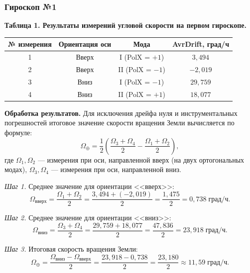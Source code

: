 \documentclass[12pt, a4paper]{article}
\begin{document}
\subsubsection*{Гироскоп №1}

\textbf{Таблица 1. Результаты измерений угловой скорости на первом гироскопе.}

\begin{table}[H]
\centering
\begin{tabular}{|c|c|c|c|}
\hline
\textbf{№ измерения} & \textbf{Ориентация оси} & \textbf{Мода} & \textbf{AvrDrift, град/ч} \\
\hline
1 & Вверх & I (PolX = $+1$) & $3{,}494$ \\
\hline
2 & Вверх & II (PolX = $-1$) & $-2{,}019$ \\
\hline
3 & Вниз & I (PolX = $-1$) & $29{,}759$ \\
\hline
4 & Вниз & II (PolX = $+1$) & $18{,}077$ \\
\hline
\end{tabular}
\end{table}

\textbf{Обработка результатов.} Для исключения дрейфа нуля и инструментальных погрешностей итоговое значение скорости вращения Земли вычисляется по формуле:
\begin{equation}
    \Omega_{\oplus} = \frac{1}{2} \left( \frac{\Omega_3 + \Omega_4}{2} - \frac{\Omega_1 + \Omega_2}{2} \right),
\end{equation}
где $\Omega_1, \Omega_2$ --- измерения при оси, направленной вверх (на двух ортогональных модах), $\Omega_3, \Omega_4$ --- измерения при оси, направленной вниз.

\textit{Шаг 1.} Среднее значение для ориентации <<вверх>>:
\begin{equation}
    \Omega_{\text{вверх}} = \frac{\Omega_1 + \Omega_2}{2} = \frac{3{,}494 + (-2{,}019)}{2} = \frac{1{,}475}{2} = 0{,}738 \; \text{град/ч}.
\end{equation}

\textit{Шаг 2.} Среднее значение для ориентации <<вниз>>:
\begin{equation}
    \Omega_{\text{вниз}} = \frac{\Omega_3 + \Omega_4}{2} = \frac{29{,}759 + 18{,}077}{2} = \frac{47{,}836}{2} = 23{,}918 \; \text{град/ч}.
\end{equation}

\textit{Шаг 3.} Итоговая скорость вращения Земли:
\begin{equation}
    \Omega_{\oplus} = \frac{\Omega_{\text{вниз}} - \Omega_{\text{вверх}}}{2} = \frac{23{,}918 - 0{,}738}{2} = \frac{23{,}180}{2} \approx 11{,}59 \; \text{град/ч}.
\end{equation}
\end{document}
